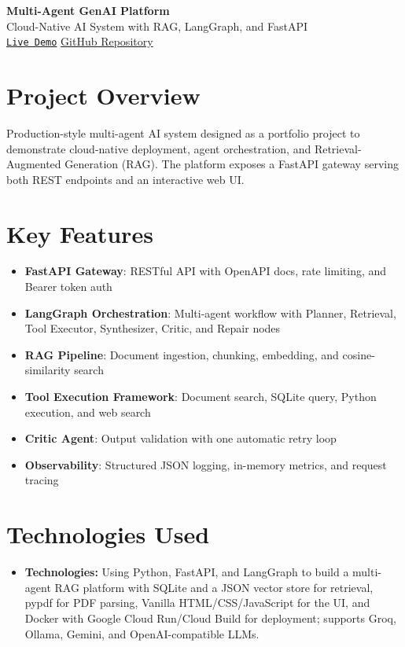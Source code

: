 \documentclass[11pt]{article}
\begin{document}
\begin{center}
    {\LARGE\bfseries Multi-Agent GenAI Platform}\\[0.3em]
    {\large Cloud-Native AI System with RAG, LangGraph, and FastAPI}\\[0.5em]
    \href{https://your-live-url.a.run.app}{\texttt{Live Demo}} \textbar{} 
    \href{https://github.com/yourusername/multi-agent-genai}{GitHub Repository}
\end{center}

\section{Project Overview}
Production-style multi-agent AI system designed as a portfolio project to demonstrate cloud-native deployment, agent orchestration, and Retrieval-Augmented Generation (RAG). The platform exposes a FastAPI gateway serving both REST endpoints and an interactive web UI.

\section{Key Features}
\begin{itemize}[leftmargin=*]
    \item \textbf{FastAPI Gateway}: RESTful API with OpenAPI docs, rate limiting, and Bearer token auth
    \item \textbf{LangGraph Orchestration}: Multi-agent workflow with Planner, Retrieval, Tool Executor, Synthesizer, Critic, and Repair nodes
    \item \textbf{RAG Pipeline}: Document ingestion, chunking, embedding, and cosine-similarity search
    \item \textbf{Tool Execution Framework}: Document search, SQLite query, Python execution, and web search
    \item \textbf{Critic Agent}: Output validation with one automatic retry loop
    \item \textbf{Observability}: Structured JSON logging, in-memory metrics, and request tracing
\end{itemize}

\section{Technologies Used}
\begin{itemize}[leftmargin=*]
    \item \textbf{Technologies:} Using Python, FastAPI, and LangGraph to build a multi-agent RAG platform with SQLite and a JSON vector store for retrieval, pypdf for PDF parsing, Vanilla HTML/CSS/JavaScript for the UI, and Docker with Google Cloud Run/Cloud Build for deployment; supports Groq, Ollama, Gemini, and OpenAI-compatible LLMs.
\end{itemize}
\end{document}
